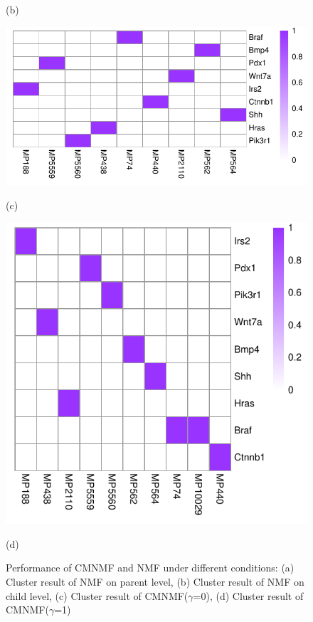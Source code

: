 \documentclass{bmcart}
\begin{document}
\begin{figure}[!h]
\begin{minipage}[t]{.40\linewidth}
    \centerline{(b)}
  \end{minipage}
  \begin{minipage}{.45\linewidth}
   \includegraphics[width=\linewidth]{DrawPictures/v_3.pdf}
    \centerline{(c)}
  \end{minipage}
  \begin{minipage}{.45\linewidth}
   \includegraphics[width=\linewidth]{DrawPictures/v_4.pdf}
    \centerline{(d)}
  \end{minipage}
  \caption{Performance of CMNMF and NMF under different conditions: (a) Cluster result of NMF on parent level, (b) Cluster result of NMF on child level, (c) Cluster result of CMNMF($\gamma$=0), (d) Cluster result of CMNMF($\gamma$=1)}
  \label{fig:simulate_data}
\end{figure}
\end{document}
